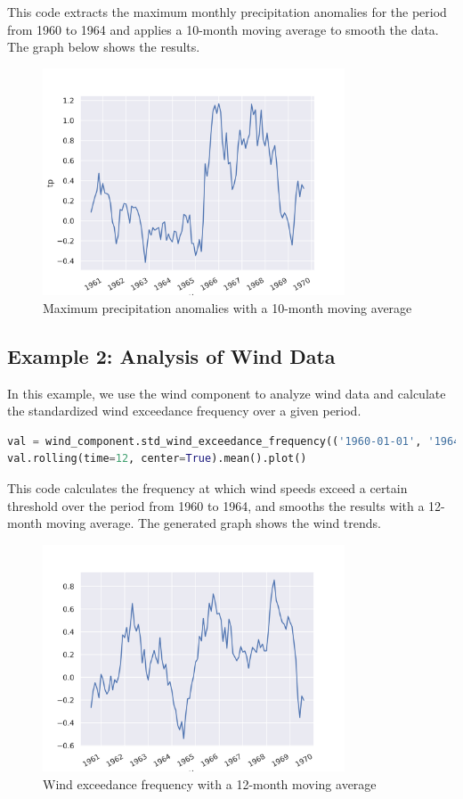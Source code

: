\documentclass[a4paper,12pt]{article}
\begin{document}
This code extracts the maximum monthly precipitation anomalies for the period from 1960 to 1964 and applies a 10-month moving average to smooth the data. The graph below shows the results.

\begin{figure}[htbp]
\centering
\includegraphics[width=0.8\textwidth]{precipitation_example.png}
\caption{Maximum precipitation anomalies with a 10-month moving average}
\end{figure}

\subsection{Example 2: Analysis of Wind Data}

In this example, we use the wind component to analyze wind data and calculate the standardized wind exceedance frequency over a given period.

\begin{lstlisting}[language=Python]
val = wind_component.std_wind_exceedance_frequency(('1960-01-01', '1964-12-31'), True)
val.rolling(time=12, center=True).mean().plot()
\end{lstlisting}

This code calculates the frequency at which wind speeds exceed a certain threshold over the period from 1960 to 1964, and smooths the results with a 12-month moving average. The generated graph shows the wind trends.

\begin{figure}[htbp]
\centering
\includegraphics[width=0.8\textwidth]{wind_example.png}
\caption{Wind exceedance frequency with a 12-month moving average}
\end{figure}
\end{document}
